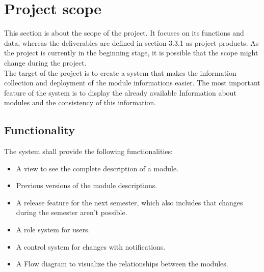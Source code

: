 \section{Project scope}
This section is about the scope of the project. It focuses on its functions and data, whereas the deliverables
are defined in section 3.3.1 as project products. As the project is currently in the beginning stage, it is possible
that the scope might change during the project.
\newline \\
The target of the project is to create a system that makes the information collection and deployment of the module informations
easier. The most important feature of the system is to display the already available Information about modules and the consistency
of this information.
    
    \subsection{Functionality}
    The system shall provide the following functionalities:

    \begin{itemize}
        \item A view to see the complete description of a module.
        \item Previous versions of the module descriptions.
        \item A release feature for the next semester, which also includes that changes during the semester aren't possible.
        \item A role system for users.
        \item A control system for changes with notifications.
        \item A Flow diagram to visualize the relationships between the modules.
    \end{itemize}

